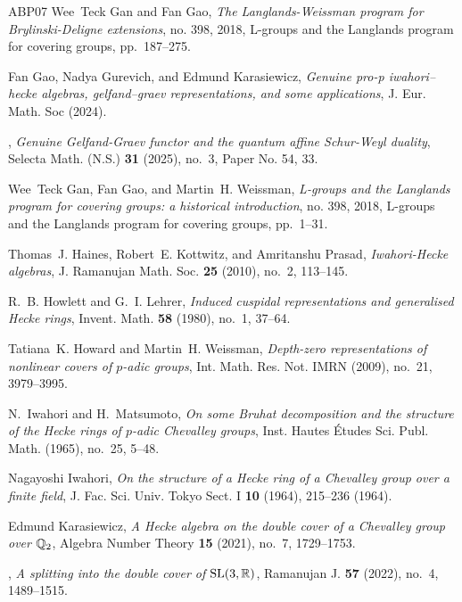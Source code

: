 \documentclass[10pt, letterpaper]{amsart}
\theoremstyle{plain}
\theoremstyle{definition}
\numberwithin{equation}{section}
\begin{document}
\begin{thebibliography}{ABP{\etalchar{+}}07}
Wee~Teck Gan and Fan Gao, \emph{The {L}anglands-{W}eissman program for
  {B}rylinski-{D}eligne extensions}, no. 398, 2018, L-groups and the Langlands
  program for covering groups, pp.~187--275.

Fan Gao, Nadya Gurevich, and Edmund Karasiewicz, \emph{Genuine pro-p
  iwahori–hecke algebras, gelfand–graev representations, and some
  applications}, J. Eur. Math. Soc (2024).

\bysame, \emph{Genuine {G}elfand-{G}raev functor and the quantum affine
  {S}chur-{W}eyl duality}, Selecta Math. (N.S.) \textbf{31} (2025), no.~3,
  Paper No. 54, 33.

Wee~Teck Gan, Fan Gao, and Martin~H. Weissman, \emph{L-groups and the
  {L}anglands program for covering groups: a historical introduction}, no. 398,
  2018, L-groups and the Langlands program for covering groups, pp.~1--31.

Thomas~J. Haines, Robert~E. Kottwitz, and Amritanshu Prasad,
  \emph{Iwahori-{H}ecke algebras}, J. Ramanujan Math. Soc. \textbf{25} (2010),
  no.~2, 113--145.

R.~B. Howlett and G.~I. Lehrer, \emph{Induced cuspidal representations and
  generalised {H}ecke rings}, Invent. Math. \textbf{58} (1980), no.~1, 37--64.

Tatiana~K. Howard and Martin~H. Weissman, \emph{Depth-zero representations of
  nonlinear covers of {$p$}-adic groups}, Int. Math. Res. Not. IMRN (2009),
  no.~21, 3979--3995.

N.~Iwahori and H.~Matsumoto, \emph{On some {B}ruhat decomposition and the
  structure of the {H}ecke rings of {$p$}-adic {C}hevalley groups}, Inst.
  Hautes \'{E}tudes Sci. Publ. Math. (1965), no.~25, 5--48.

Nagayoshi Iwahori, \emph{On the structure of a {H}ecke ring of a {C}hevalley
  group over a finite field}, J. Fac. Sci. Univ. Tokyo Sect. I \textbf{10}
  (1964), 215--236 (1964).

Edmund Karasiewicz, \emph{A {H}ecke algebra on the double cover of a
  {C}hevalley group over {$\Bbb{Q}_2$}}, Algebra Number Theory \textbf{15}
  (2021), no.~7, 1729--1753.

\bysame, \emph{A splitting into the double cover of {${\rm SL}(3,\Bbb R)$}},
  Ramanujan J. \textbf{57} (2022), no.~4, 1489--1515.


\end{thebibliography}
\end{document}
